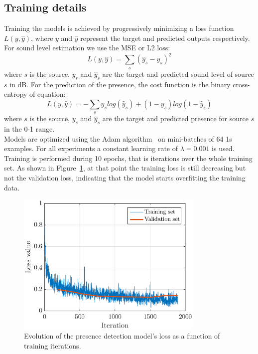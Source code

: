 \documentclass[11pt,a4paper]{article}
\begin{document}
\subsection{Training details}

Training the models is achieved by progressively minimizing a loss function $L(y, \hat y)$, where $y$ and $\hat y$ represent the target and predicted outputs respectively. For sound level estimation we use the MSE or L2 loss:
\begin{equation}
L(y, \hat y) = \sum_s \left(\hat y_s - y_s\right)^2
\end{equation}
where $s$ is the source, $y_s$ and $\hat y_s$ are the target and predicted sound level of source $s$ in dB. For the prediction of the presence, the cost function is the binary cross-entropy of equation:
\begin{equation}
L(y, \hat y) = -\sum_s y_s log\left(\hat y_s\right) + (1-y_s) log\left(1-\hat y_s\right)
\end{equation}
where $s$ is the source, $y_s$ and $\hat y_s$ are the target and predicted presence for source $s$ in the 0-1 range.\\

Models are optimized using the Adam algorithm~\cite{kingma2015} on mini-batches of 64 1s examples. For all experiments a constant learning rate of $\lambda = 0.001$ is used. Training is performed during 10 epochs, that is iterations over the whole training set. As shown in Figure~\ref{fig:mdl_loss}, at that point the training loss is still decreasing but not the validation loss, indicating that the model starts overfitting the training data.

\begin{figure}[!h]
    \centering
    \includegraphics[width=0.8\textwidth]{figures/mdl_loss.eps}
    \caption{Evolution of the presence detection model's loss as a function of training iterations.}\label{fig:mdl_loss}
\end{figure}
\end{document}
